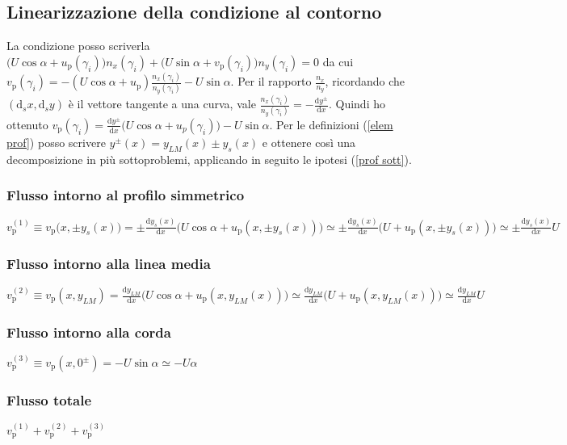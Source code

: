 \documentclass[11pt,a4paper]{report}
\newcommand{\de}{\mathrm d}
\begin{document}
		\subsection{Linearizzazione della condizione al contorno}
		La condizione posso scriverla $\big(U\cos\alpha+u_\mathrm p(\gamma_i)\big)n_x(\gamma_i)+\big(U\sin\alpha+v_\mathrm p(\gamma_i)\big)n_y(\gamma_i)=0$ da cui $v_\mathrm p(\gamma_i)=-(U\cos\alpha+u_\mathrm p)\frac{n_x(\gamma_i)}{n_y(\gamma_i)}-U\sin\alpha$. Per il rapporto $\frac{n_x}{n_y}$, ricordando che $(\de _sx,\de _sy )$ è il vettore tangente a una curva, vale $\frac{n_x(\gamma_i)}{n_y(\gamma_i)}=-\frac{\de y^\pm}{\de x}$. Quindi ho ottenuto $v_\mathrm p(\gamma_i)=\frac{\de y^\pm}{\de x}\big(U\cos\alpha+u_p(\gamma_i)\big)-U\sin\alpha$. Per le definizioni (\ref{elem prof}) posso scrivere $y^\pm(x)=y_{LM}(x)\pm y_s(x)$ e ottenere così una decomposizione in più sottoproblemi, applicando in seguito le ipotesi (\ref{prof sott}).
			\subsubsection{Flusso intorno al profilo simmetrico}
			$v_\mathrm p^{(1)}\equiv v_\mathrm p\big(x,\pm y_s(x))=\pm\frac{\de y_s(x)}{\de x}\big(U\cos\alpha+u_\mathrm p(x,\pm y_s(x))\big)\simeq\pm\frac{\de y_s(x)}{\de x}\big(U+u_\mathrm p(x,\pm y_s(x))\big)\simeq\pm\frac{\de y_s(x)}{\de x}U$
			\subsubsection{Flusso intorno alla linea media}
			$v_\mathrm p^{(2)}\equiv v_\mathrm p(x,y_{LM})=\frac{\de y_{LM}}{\de x}\big(U\cos\alpha+u_\mathrm p(x,y_{LM}(x))\big)\simeq\frac{\de y_{LM}}{\de x}\big(U+u_\mathrm p(x,y_{LM}(x))\big)\simeq\frac{\de y_{LM}}{\de x}U$
			\subsubsection{Flusso intorno alla corda}
			$v_\mathrm p^{(3)}\equiv v_\mathrm p(x,0^\pm)=-U\sin\alpha\simeq -U\alpha$
			\subsubsection{Flusso totale}
			$v_\mathrm p^{(1)}+v_\mathrm p^{(2)}+v_\mathrm p^{(3)}$
			
\end{document}
